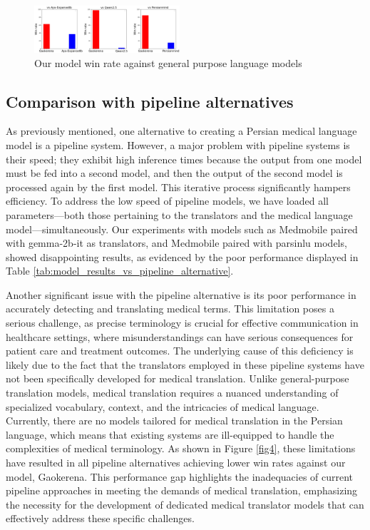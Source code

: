 \documentclass[conference]{IEEEtran}
\begin{document}
	\begin{figure}[htbp]
		\centerline{\includegraphics[width=0.48\textwidth]{fig3.png}}
		\caption{Our model win rate against general purpose language models}
		\label{fig3}
	\end{figure}
	\subsection{Comparison with pipeline alternatives}
	As previously mentioned, one alternative to creating a Persian medical language model is a pipeline system. However, a major problem with pipeline systems is their speed; they exhibit high inference times because the output from one model must be fed into a second model, and then the output of the second model is processed again by the first model. This iterative process significantly hampers efficiency.
	To address the low speed of pipeline models, we have loaded all parameters—both those pertaining to the translators and the medical language model—simultaneously. Our experiments with models such as Medmobile \cite{b9} paired with gemma-2b-it 
	\cite{b14}
	as translators, and Medmobile paired with parsinlu 
	\cite{b32} \cite{b34} 
	models, showed disappointing results, as evidenced by the poor performance displayed in Table \ref{tab:model_results_vs_pipeline_alternative}.
	
	Another significant issue with the pipeline alternative is its poor performance in accurately detecting and translating medical terms. This limitation poses a serious challenge, as precise terminology is crucial for effective communication in healthcare settings, where misunderstandings can have serious consequences for patient care and treatment outcomes. The underlying cause of this deficiency is likely due to the fact that the translators employed in these pipeline systems have not been specifically developed for medical translation. Unlike general-purpose translation models, medical translation requires a nuanced understanding of specialized vocabulary, context, and the intricacies of medical language.
	Currently, there are no models tailored for medical translation in the Persian language, which means that existing systems are ill-equipped to handle the complexities of medical terminology. As shown in Figure \ref{fig4}, these limitations have resulted in all pipeline alternatives achieving lower win rates against our model, Gaokerena. This performance gap highlights the inadequacies of current pipeline approaches in meeting the demands of medical translation, emphasizing the necessity for the development of dedicated medical translator models that can effectively address these specific challenges.
	
\end{document}
